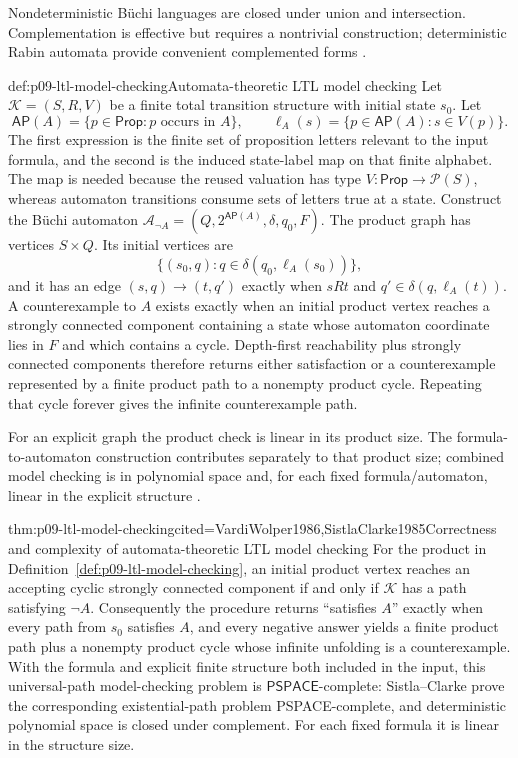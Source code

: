 Nondeterministic B\"uchi languages are closed under union and intersection.
Complementation is effective but requires a nontrivial construction;
deterministic Rabin automata provide convenient complemented forms
\cite{Safra1995Extended,Thomas1996Report}.

\begin{hbmethod}{def:p09-ltl-model-checking}{Automata-theoretic LTL model checking}
Let \(\mathcal K=(S,R,V)\) be a finite total transition structure with initial
state \(s_0\).  Let
\[
 \mathsf{AP}(A)=\{p\in\mathsf{Prop}:p\text{ occurs in }A\},
 \qquad
 \ell_A(s)=\{p\in\mathsf{AP}(A):s\in V(p)\}.
\]
The first expression is the finite set of proposition letters relevant to the
input formula, and the second is the induced state-label map on that finite
alphabet.  The map is needed because the reused valuation has type
\(V:\mathsf{Prop}\to\mathcal P(S)\), whereas automaton transitions consume
sets of letters true at a state.  Construct the B\"uchi automaton
\(\mathcal A_{\neg A}=(Q,2^{\mathsf{AP}(A)},\delta,q_0,F)\).
The product graph has vertices \(S\times Q\).  Its initial vertices are
\[
 \{(s_0,q):q\in\delta(q_0,\ell_A(s_0))\},
\]
and it has an edge
\((s,q)\to(t,q')\) exactly when \(sRt\) and
\(q'\in\delta(q,\ell_A(t))\).  A counterexample to \(A\) exists exactly when an
initial product vertex reaches a strongly connected component containing a
state whose automaton coordinate lies in \(F\) and which contains a cycle.
Depth-first reachability plus strongly connected components therefore returns
either satisfaction or a counterexample represented by a finite product path
to a nonempty product cycle.  Repeating that cycle forever gives the infinite
counterexample path.

For an explicit graph the product check is linear in its product size.  The
formula-to-automaton construction contributes separately to that product size;
combined model checking is in polynomial space and, for each fixed
formula/automaton, linear in the explicit structure
\cite{VardiWolper1986,SistlaClarke1985}.
\end{hbmethod}

\begin{hbtheorem}{thm:p09-ltl-model-checking}{cited=VardiWolper1986,SistlaClarke1985}{Correctness and complexity of automata-theoretic LTL model checking}
For the product in Definition~\ref{def:p09-ltl-model-checking}, an initial
product vertex reaches an accepting cyclic strongly connected component if
and only if \(\mathcal K\) has a path satisfying \(\neg A\).  Consequently the
procedure returns ``satisfies \(A\)'' exactly when every path from \(s_0\)
satisfies \(A\), and every negative answer yields a finite product path plus a
nonempty product cycle whose infinite unfolding is a counterexample.  With the
formula and explicit finite structure both included
in the input, this universal-path model-checking problem is
\(\mathsf{PSPACE}\)-complete: Sistla--Clarke prove the corresponding
existential-path problem PSPACE-complete, and deterministic polynomial space
is closed under complement.  For each fixed formula it is linear in the
structure size.
\end{hbtheorem}

